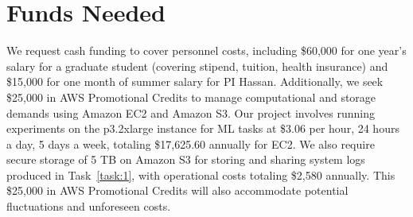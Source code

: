     
\section*{Funds Needed}

We request cash funding to cover personnel costs, including \$60,000 for one year's salary for a graduate student (covering stipend, tuition, health insurance) and \$15,000 for one month of summer salary for PI Hassan. Additionally, we seek \$25,000 in AWS Promotional Credits to manage computational and storage demands using Amazon EC2 and Amazon S3. Our project involves running experiments on the p3.2xlarge instance for ML tasks at \$3.06 per hour, 24 hours a day, 5 days a week, totaling \$17,625.60 annually for EC2. We also require secure storage of 5 TB on Amazon S3 for storing and sharing system logs produced in Task~\ref{task:1}, with operational costs totaling \$2,580 annually. This \$25,000 in AWS Promotional Credits will also accommodate potential fluctuations and unforeseen costs.

